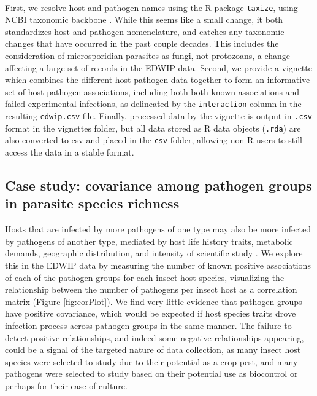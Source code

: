 \documentclass[12pt]{article}
\begin{document}
\paragraph*{}
First, we resolve host and pathogen names using the R package \texttt{taxize}, using NCBI taxonomic backbone \citep{chamberlain2013}. While this seems like a small change, it both standardizes host and pathogen nomenclature, and catches any taxonomic changes that have occurred in the past couple decades. This includes the consideration of microsporidian parasites as fungi, not protozoans, a change affecting a large set of records in the EDWIP data. Second, we provide a vignette which combines the different host-pathogen data together to form an informative set of host-pathogen associations, including both both known associations and failed experimental infections, as delineated by the \texttt{interaction} column in the resulting \texttt{edwip.csv} file. Finally, processed data by the vignette is output in \texttt{.csv} format in the vignettes folder, but all data stored as R data objects (\texttt{.rda}) are also converted to csv and placed in the \texttt{csv} folder, allowing non-R users to still access the data in a stable format. 





















\subsection*{Case study: covariance among pathogen groups in parasite species richness }

Hosts that are infected by more pathogens of one type may also be more infected by pathogens of another type, mediated by host life history traits, metabolic demands, geographic distribution, and intensity of scientific study \citep{dallas2021}. We explore this in the EDWIP data by measuring the number of known positive associations of each of the pathogen groups for each insect host species, visualizing the relationship between the number of pathogens per insect host as a correlation matrix (Figure \ref{fig:corPlot}). We find very little evidence that pathogen groups have positive covariance, which would be expected if host species traits drove infection process across pathogen groups in the same manner. The failure to detect positive relationships, and indeed some negative relationships appearing, could be a signal of the targeted nature of data collection, as many insect host species were selected to study due to their potential as a crop pest, and many pathogens were selected to study based on their potential use as biocontrol or perhaps for their ease of culture. 
\end{document}
